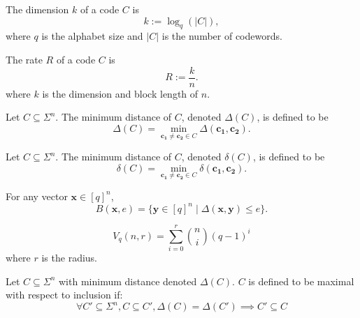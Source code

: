\begin{definition}[Dimension]
    \label{def:dim}
    \leanok
    The dimension $k$ of a code $C$ is
    \[
        k := \log_{q}(\lvert C\rvert),
    \]
    where $q$ is the alphabet size and $\lvert C\rvert$ is the number of codewords.
\end{definition}

\begin{definition}[Rate]
    \label{def:rate}
    \leanok
    The rate $R$ of a code $C$ is
    \[
        R := \frac{k}{n}.
    \]
    where $k$ is the dimension and block length of $n$.
\end{definition}

\begin{definition}
  \label{def:MinDim}
  \leanok
  Let $C \subseteq \Sigma^{n}$.
  The minimum distance of $C$, denoted $\Delta(C)$, is defined to be
  \[\Delta(C) = \min_{\mathbf{c_{1}} \neq \mathbf{c_{2}} \in C} \Delta(\mathbf{c_{1}}, \mathbf{c_{2}}).\]
\end{definition}

\begin{definition}
  \label{def:RelMinDim}
  \leanok
  Let $C \subseteq \Sigma^{n}$.
  The minimum distance of $C$, denoted $\delta(C)$, is defined to be
  \[\delta(C) = \min_{\mathbf{c_{1}} \neq \mathbf{c_{2}} \in C} \delta(\mathbf{c_{1}}, \mathbf{c_{2}}).\]
\end{definition}

\begin{definition}
  \label{def:HammingBall}
  \leanok
  For any vector $\mathbf{x} \in [q]^{n}$,
  \[B(\mathbf{x},e) = \{\mathbf{y} \in [q]^{n}\mid \Delta(\mathbf{x},\mathbf{y}) \leq e\}.\]
\end{definition}

\begin{definition}[Volume]
  \label{def:Vol}
  \leanok
  \[V_{q}(n,r) = \sum^{r}_{i = 0} \binom{n}{i}(q-1)^{i}\]
  where $r$ is the radius.
\end{definition}

\begin{definition}
  \label{def:maximalWrtInclusion}
  \leanok
  Let $C\subseteq \Sigma^{n}$ with minimum distance denoted $\Delta(C)$.
  $C$ is defined to be maximal with respect to inclusion if:
  \[\forall C' \subseteq \Sigma^{n}, C\subseteq C', \Delta(C) = \Delta(C') \implies C'\subseteq C\]
\end{definition}


